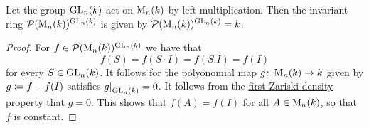 \begin{proposition}
  \label{proposition: GLn invariants for left multiplication}
  Let the group $\operatorname{GL}_n(k)$ act on $\operatorname{M}_n(k)$ by left multiplication.
  Then the invariant ring $\mathcal{P}(\operatorname{M}_n(k))^{\operatorname{GL}_n(k)}$ is given by $\mathcal{P}(\operatorname{M}_n(k))^{\operatorname{GL}_n(k)} = k$.
\end{proposition}


\begin{proof}
  For $f \in \mathcal{P}(\operatorname{M}_n(k))^{\operatorname{GL}_n(k)}$ we have that
  \[
      f(S)
    = f(S \cdot I)
    = f(S.I)
    = f(I)
  \]
  for every $S \in \operatorname{GL}_n(k)$.
  It follows for the polyonomial map $g \colon \operatorname{M}_n(k) \to k$ given by $g \coloneqq f - f(I)$ satisfies $\restrict{g}{\GL_n(k)} = 0$.
  It follows from the \hyperref[proposition: zariski density properties]{first Zariski density property} that $g = 0$.
  This shows that $f(A) = f(I)$ for all $A \in \operatorname{M}_n(k)$, so that $f$ is constant.
\end{proof}


